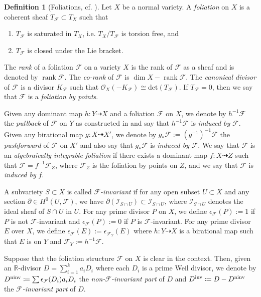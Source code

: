 \documentclass[12pt]{amsart}
\numberwithin{equation}{section}
\newcommand{\rk}{\operatorname{rank}}
\newcommand{\Ff}{\mathcal{F}}
\theoremstyle{definition}
\newtheorem{defn}[thm]{Definition}
\theoremstyle{definition}
\theoremstyle{definition}
\begin{document}
\begin{defn}[Foliations, {cf. \cite{ACSS21,CS21}}]\label{defn: foliation}
Let $X$ be a normal variety. A \emph{foliation} on $X$ is a coherent sheaf $T_{\Ff}\subset T_X$ such that
\begin{enumerate}
    \item $T_{\Ff}$ is saturated in $T_X$, i.e. $T_X/T_{\Ff}$ is torsion free, and
    \item $T_{\Ff}$ is closed under the Lie bracket.
\end{enumerate}

The \emph{rank} of a foliation $\Ff$ on a variety $X$ is the rank of $\Ff$ as a sheaf and is denoted by $\rk\Ff$. 
The \emph{co-rank} of $\Ff$ is $\dim X-\rk\Ff$. The \emph{canonical divisor} of $\Ff$ is a divisor $K_\Ff$ such that $\mathcal{O}_X(-K_{\mathcal{F}})\cong\mathrm{det}(T_\Ff)$. If $T_\Ff=0$, then we say that $\Ff$ is a \emph{foliation by points}.

Given any dominant map 
$h: Y\dashrightarrow X$ and a foliation $\mathcal F$ on $X$, we denote by $h^{-1}\Ff$ the \emph{pullback} of $\Ff$ on $Y$ as constructed in \cite[3.2]{Dru21} and say that $h^{-1}\Ff$ is \emph{induced by} $\Ff$. Given any birational map $g: X\dashrightarrow X'$, we denote by $g_\ast \Ff:=(g^{-1})^{-1}\Ff$ the \emph{pushforward} of $\Ff$ on $X'$ and also say that $g_\ast \Ff$ is \emph{induced by} $\Ff$. We say that $\Ff$ is an \emph{algebraically integrable foliation} if there exists a dominant map $f: X\dashrightarrow Z$ such that $\Ff=f^{-1}\Ff_Z$, where $\Ff_Z$ is the foliation by points on $Z$, and we say that $\Ff$ is \emph{induced by} $f$.

A subvariety $S\subset X$ is called \emph{$\Ff$-invariant} if for any open subset $U\subset X$ and any section $\partial\in H^0(U,\Ff)$, we have $\partial(\mathcal{I}_{S\cap U})\subset \mathcal{I}_{S\cap U}$,  where $\mathcal{I}_{S\cap U}$ denotes the ideal sheaf of $S\cap U$ in $U$.  
For any prime divisor $P$ on $X$, we define $\epsilon_{\Ff}(P):=1$ if $P$ is not $\Ff$-invariant and $\epsilon_{\Ff}(P):=0$ if $P$ is $\Ff$-invariant. For any prime divisor $E$ over $X$, we define $\epsilon_{\Ff}(E):=\epsilon_{\Ff_Y}(E)$ where $h: Y\dashrightarrow X$ is a birational map such that $E$ is on $Y$ and $\Ff_Y:=h^{-1}\Ff$.

Suppose that the foliation structure $\Ff$ on $X$ is clear in the context. Then, given an $\mathbb R$-divisor $D = \sum_{i = 1}^k a_iD_i$ where each $D_i$ is a prime Weil divisor,
we denote by $D^{{\rm ninv}} \coloneqq \sum \epsilon_{\mathcal F}(D_i)a_iD_i$ the \emph{non-$\Ff$-invariant part} of $D$ and $D^{{\rm inv}} \coloneqq D-D^{{\rm ninv}}$ the \emph{$\Ff$-invariant part} of $D$.
\end{defn}
\end{document}
